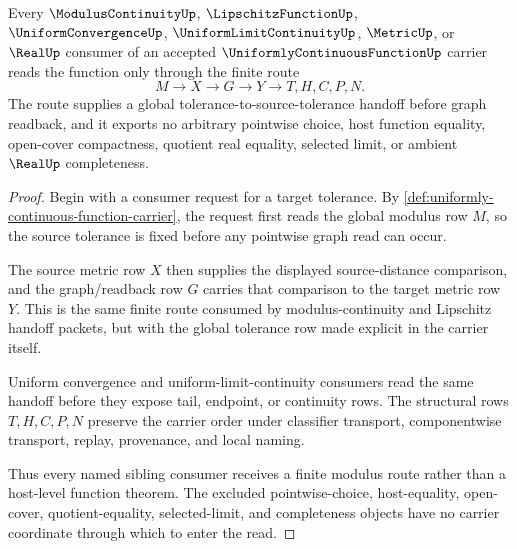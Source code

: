 \begin{theorem}
\label{thm:uniformly-continuous-function-modulus-route}
Every $\ModulusContinuityUp$, $\LipschitzFunctionUp$, $\UniformConvergenceUp$, $\UniformLimitContinuityUp$, $\MetricUp$, or $\RealUp$ consumer of an accepted $\UniformlyContinuousFunctionUp$ carrier reads the function only through the finite route
$$
M \to X \to G \to Y \to T,H,C,P,N .
$$
The route supplies a global tolerance-to-source-tolerance handoff before graph readback, and it exports no arbitrary pointwise choice, host function equality, open-cover compactness, quotient real equality, selected limit, or ambient $\RealUp$ completeness.
\end{theorem}
\begin{proof}
Begin with a consumer request for a target tolerance. By \autoref{def:uniformly-continuous-function-carrier}, the request first reads the global modulus row $M$, so the source tolerance is fixed before any pointwise graph read can occur.

The source metric row $X$ then supplies the displayed source-distance comparison, and the graph/readback row $G$ carries that comparison to the target metric row $Y$. This is the same finite route consumed by modulus-continuity and Lipschitz handoff packets, but with the global tolerance row made explicit in the carrier itself.

Uniform convergence and uniform-limit-continuity consumers read the same handoff before they expose tail, endpoint, or continuity rows. The structural rows $T,H,C,P,N$ preserve the carrier order under classifier transport, componentwise transport, replay, provenance, and local naming.

Thus every named sibling consumer receives a finite modulus route rather than a host-level function theorem. The excluded pointwise-choice, host-equality, open-cover, quotient-equality, selected-limit, and completeness objects have no carrier coordinate through which to enter the read.
\end{proof}



